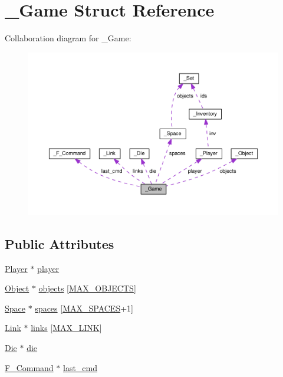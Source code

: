 \hypertarget{struct__Game}{\section{\+\_\+\+Game Struct Reference}
\label{struct__Game}
}


Collaboration diagram for \+\_\+\+Game\+:\nopagebreak
\begin{figure}[H]
\begin{center}
\leavevmode
\includegraphics[width=350pt]{struct__Game__coll__graph}
\end{center}
\end{figure}
\subsection*{Public Attributes}
\begin{DoxyCompactItemize}
\item 
\hyperlink{player_8h_af30e2030635a69690f85e48bc6ef202f}{Player} $\ast$ \hyperlink{struct__Game_a31406605782d71ec00c4bf258ea76267}{player}
\item 
\hyperlink{object_8h_a7f8bbcda919b65ce67f92fba08e0212f}{Object} $\ast$ \hyperlink{struct__Game_ad45bf5645a26e546d0060a2e61f9cf81}{objects} \mbox{[}\hyperlink{game_8h_acdc7844fbd4d45737d4aa56834d37829}{M\+A\+X\+\_\+\+O\+B\+J\+E\+C\+T\+S}\mbox{]}
\item 
\hyperlink{space_8h_a67533ffc2b70463baecc38fb0629bbfc}{Space} $\ast$ \hyperlink{struct__Game_ab4180417d9148f8abb2233ca6c4ecfe5}{spaces} \mbox{[}\hyperlink{space_8h_a5f54fd55f983a2e33ce076cd9f587e82}{M\+A\+X\+\_\+\+S\+P\+A\+C\+E\+S}+1\mbox{]}
\item 
\hyperlink{link_8h_ae3b299941e67be6971bfd64a25505eff}{Link} $\ast$ \hyperlink{struct__Game_aa4ff88aaf2a54616e5863609effad94e}{links} \mbox{[}\hyperlink{link_8h_abfa744c8ca5b46f7f2a10aea53a4ec59}{M\+A\+X\+\_\+\+L\+I\+N\+K}\mbox{]}
\item 
\hyperlink{die_8h_a892f0b0bf81d69a1f7a14ea238e36dd3}{Die} $\ast$ \hyperlink{struct__Game_a0d6009b5dcb080489c192a9198fa7d46}{die}
\item 
\hyperlink{command_8h_a76085817cb558dc3640088040ba47898}{F\+\_\+\+Command} $\ast$ \hyperlink{struct__Game_a6dd34045346b3ea8dd1a4e3f08ab71c5}{last\+\_\+cmd}
\end{DoxyCompactItemize}


